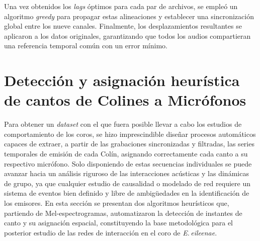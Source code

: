 Una vez obtenidos los \emph{lags} óptimos para cada par de 
archivos, se empleó un algoritmo \textit{greedy} para propagar 
estas alineaciones y establecer una sincronización global entre 
los nueve canales. Finalmente, los desplazamientos resultantes 
se aplicaron a los datos originales, garantizando que todos los 
audios compartieran una referencia temporal común con un error 
mínimo.






\section{Detección y asignación heurística de cantos de Colines a Micrófonos}
\label{sec:deteccion_asignacion}


Para obtener un \emph{dataset} con el que fuera posible llevar a cabo 
los estudios de comportamiento de los coros, 
se hizo imprescindible diseñar procesos automáticos 
capaces de extraer, a partir de las grabaciones sincronizadas y 
filtradas, las series temporales de emisión de cada Colín,
asignando correctamente cada canto a su respectivo micrófono.
Solo disponiendo de estas secuencias individuales se puede 
avanzar hacia un análisis riguroso de las interacciones 
acústicas y las dinámicas de grupo, ya que cualquier estudio
de causalidad o modelado de red requiere un 
sistema de eventos bien definido y libre de ambigüedades en la 
identificación de los emisores. En esta sección se presentan 
dos algoritmos heurísticos que, partiendo de Mel-espectrogramas, 
automatizaron la detección de instantes de 
canto y su asignación espacial, constituyendo la base 
metodológica para el posterior estudio de las redes de 
interacción en el coro de \emph{E.\,eileenae}.



